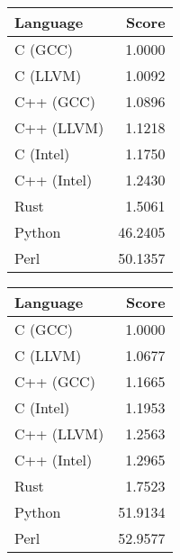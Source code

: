 \begin{subtable}{0.33\textwidth}
    \centering
    \caption{$k=1$}
    \label{table:runtime:dfa_gap(1)}
    \begin{tabular}{|l|r|}
        \hline
        Language & Score \\
        \hline
        C (GCC) & 1.0000 \\
        C (LLVM) & 1.0092 \\
        C++ (GCC) & 1.0896 \\
        C++ (LLVM) & 1.1218 \\
        C (Intel) & 1.1750 \\
        C++ (Intel) & 1.2430 \\
        Rust & 1.5061 \\
        Python & 46.2405 \\
        Perl & 50.1357 \\
        \hline
    \end{tabular}
\end{subtable}%
\begin{subtable}{0.33\textwidth}
    \centering
    \caption{$k=2$}
    \label{table:runtime:dfa_gap(2)}
    \begin{tabular}{|l|r|}
        \hline
        Language & Score \\
        \hline
        C (GCC) & 1.0000 \\
        C (LLVM) & 1.0677 \\
        C++ (GCC) & 1.1665 \\
        C (Intel) & 1.1953 \\
        C++ (LLVM) & 1.2563 \\
        C++ (Intel) & 1.2965 \\
        Rust & 1.7523 \\
        Python & 51.9134 \\
        Perl & 52.9577 \\
        \hline
    \end{tabular}
\end{subtable}%
